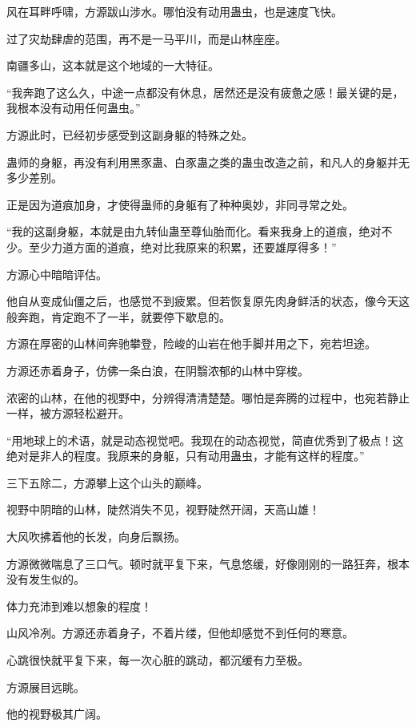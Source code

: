 
\begin{this_body}

风在耳畔呼啸，方源跋山涉水。哪怕没有动用蛊虫，也是速度飞快。

过了灾劫肆虐的范围，再不是一马平川，而是山林座座。

南疆多山，这本就是这个地域的一大特征。

“我奔跑了这么久，中途一点都没有休息，居然还是没有疲惫之感！最关键的是，我根本没有动用任何蛊虫。”

方源此时，已经初步感受到这副身躯的特殊之处。

蛊师的身躯，再没有利用黑豕蛊、白豕蛊之类的蛊虫改造之前，和凡人的身躯并无多少差别。

正是因为道痕加身，才使得蛊师的身躯有了种种奥妙，非同寻常之处。

“我的这副身躯，本就是由九转仙蛊至尊仙胎而化。看来我身上的道痕，绝对不少。至少力道方面的道痕，绝对比我原来的积累，还要雄厚得多！”

方源心中暗暗评估。

他自从变成仙僵之后，也感觉不到疲累。但若恢复原先肉身鲜活的状态，像今天这般奔跑，肯定跑不了一半，就要停下歇息的。

方源在厚密的山林间奔驰攀登，险峻的山岩在他手脚并用之下，宛若坦途。

方源还赤着身子，仿佛一条白浪，在阴翳浓郁的山林中穿梭。

浓密的山林，在他的视野中，分辨得清清楚楚。哪怕是奔腾的过程中，也宛若静止一样，被方源轻松避开。

“用地球上的术语，就是动态视觉吧。我现在的动态视觉，简直优秀到了极点！这绝对是非人的程度。我原来的身躯，只有动用蛊虫，才能有这样的程度。”

三下五除二，方源攀上这个山头的巅峰。

视野中阴暗的山林，陡然消失不见，视野陡然开阔，天高山雄！

大风吹拂着他的长发，向身后飘扬。

方源微微喘息了三口气。顿时就平复下来，气息悠缓，好像刚刚的一路狂奔，根本没有发生似的。

体力充沛到难以想象的程度！

山风冷冽。方源还赤着身子，不着片缕，但他却感觉不到任何的寒意。

心跳很快就平复下来，每一次心脏的跳动，都沉缓有力至极。

方源展目远眺。

他的视野极其广阔。


\end{this_body}
